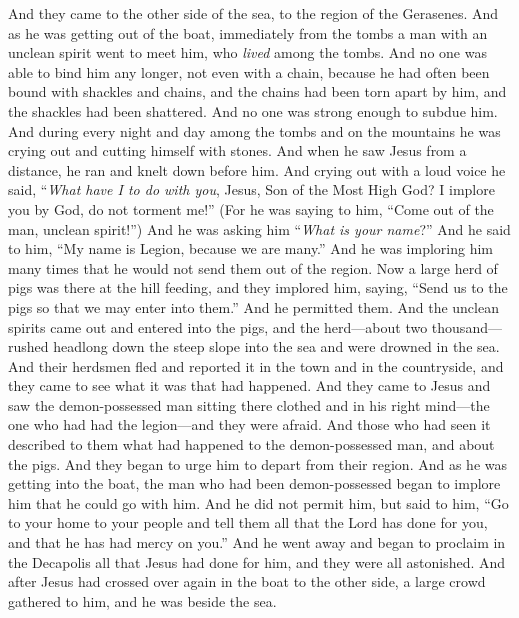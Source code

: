 \begin{biblechapter} %
 And they came to the other side of the sea, to the region of the Gerasenes.
\verse And as he was getting out of the boat, immediately from the tombs a man with an unclean spirit went to meet him,
\verse who \textit{lived} among the tombs. And no one was able to bind him any longer, not even with a chain,
\verse because he had often been bound with shackles and chains, and the chains had been torn apart by him, and the shackles had been shattered. And no one was strong enough to subdue him.
\verse And during every night and day among the tombs and on the mountains he was crying out and cutting himself with stones.
\verse And when he saw Jesus from a distance, he ran and knelt down before him.
\verse And crying out with a loud voice he said, “\textit{What have I to do with you}, Jesus, Son of the Most High God? I implore you by God, do not torment me!”
\verse (For he was saying to him, “Come out of the man, unclean spirit!”)
\verse And he was asking him “\textit{What is your name}?” And he said to him, “My name is Legion, because we are many.”
\verse And he was imploring him many times that he would not send them out of the region.
\verse Now a large herd of pigs was there at the hill feeding,
\verse and they implored him, saying, “Send us to the pigs so that we may enter into them.”
\verse And he permitted them. And the unclean spirits came out and entered into the pigs, and the herd—about two thousand—rushed headlong down the steep slope into the sea and were drowned in the sea.
\verse And their herdsmen fled and reported it in the town and in the countryside, and they came to see what it was that had happened.
\verse And they came to Jesus and saw the demon-possessed man sitting there clothed and in his right mind—the one who had had the legion—and they were afraid.
\verse And those who had seen it described to them what had happened to the demon-possessed man, and about the pigs.
\verse And they began to urge him to depart from their region.
\verse And as he was getting into the boat, the man who had been demon-possessed began to implore him that he could go with him.
\verse And he did not permit him, but said to him, “Go to your home to your people and tell them all that the Lord has done for you, and that he has had mercy on you.”
\verse And he went away and began to proclaim in the Decapolis all that Jesus had done for him, and they were all astonished.
 And after Jesus had crossed over again in the boat to the other side, a large crowd gathered to him, and he was beside the sea.

\end{biblechapter}
